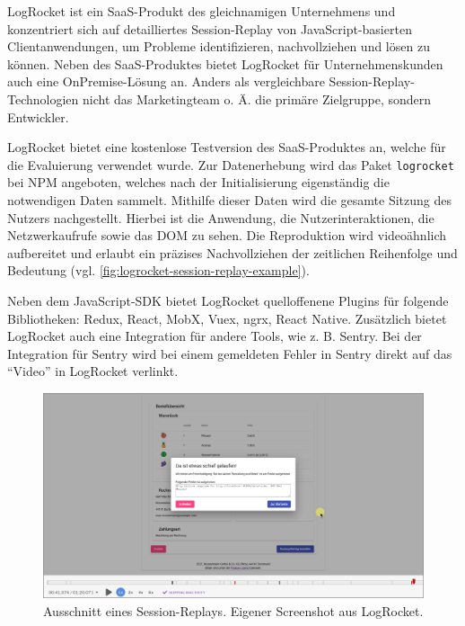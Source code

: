 LogRocket \cite{LogRocket} ist ein SaaS-Produkt des gleichnamigen Unternehmens und konzentriert sich auf detailliertes Session-Replay von JavaScript-basierten Clientanwendungen, um Probleme identifizieren, nachvollziehen und lösen zu können. Neben des SaaS-Produktes bietet LogRocket für Unternehmenskunden auch eine OnPremise-Lösung an. Anders als vergleichbare Session-Replay-Technologien nicht das Marketingteam o. Ä. \cite{Webalyt} die primäre Zielgruppe, sondern Entwickler.

LogRocket bietet eine kostenlose Testversion des SaaS-Produktes an, welche für die Evaluierung verwendet wurde. Zur Datenerhebung wird das Paket \texttt{logrocket} bei NPM \cite{NPM} angeboten, welches nach der Initialisierung eigenständig die notwendigen Daten sammelt. Mithilfe dieser Daten wird die gesamte Sitzung des Nutzers nachgestellt. Hierbei ist die Anwendung, die Nutzerinteraktionen, die Netzwerkaufrufe sowie das DOM zu sehen. Die Reproduktion wird videoähnlich aufbereitet und erlaubt ein präzises Nachvollziehen der zeitlichen Reihenfolge und Bedeutung (vgl. \autoref{fig:logrocket-session-replay-example}).

Neben dem JavaScript-SDK bietet LogRocket quelloffenene Plugins für folgende Bibliotheken: Redux, React, MobX, Vuex, ngrx, React Native. Zusätzlich bietet LogRocket auch eine Integration für andere Tools, wie z. B. Sentry. Bei der Integration für Sentry wird bei einem gemeldeten Fehler in Sentry direkt auf das \enquote{Video} in LogRocket verlinkt.

\begin{figure}[H]
	\centering
	\includegraphics[width=\linewidth]{img/03_methoden/logrocket_session-replay-example-cropped.png}
	\caption{Ausschnitt eines Session-Replays. Eigener Screenshot aus LogRocket.}
	\label{fig:logrocket-session-replay-example}
\end{figure}